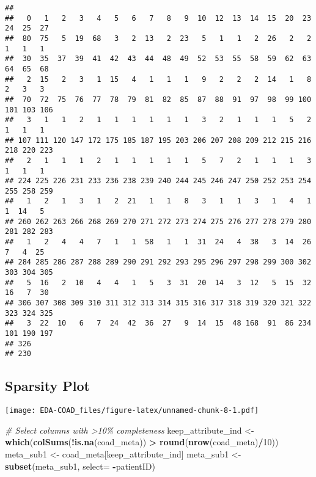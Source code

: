 \documentclass[
]{article}
\newenvironment{Shaded}{\begin{snugshade}}{\end{snugshade}}
\newcommand{\AttributeTok}[1]{\textcolor[rgb]{0.13,0.29,0.53}{#1}}
\newcommand{\CommentTok}[1]{\textcolor[rgb]{0.56,0.35,0.01}{\textit{#1}}}
\newcommand{\DecValTok}[1]{\textcolor[rgb]{0.00,0.00,0.81}{#1}}
\newcommand{\FunctionTok}[1]{\textcolor[rgb]{0.13,0.29,0.53}{\textbf{#1}}}
\newcommand{\NormalTok}[1]{#1}
\newcommand{\OtherTok}[1]{\textcolor[rgb]{0.56,0.35,0.01}{#1}}
\newcommand{\SpecialCharTok}[1]{\textcolor[rgb]{0.81,0.36,0.00}{\textbf{#1}}}
\begin{document}
\begin{verbatim}
## 
##   0   1   2   3   4   5   6   7   8   9  10  12  13  14  15  20  23  24  25  27 
##  80  75   5  19  68   3   2  13   2  23   5   1   1   2  26   2   2   1   1   1 
##  30  35  37  39  41  42  43  44  48  49  52  53  55  58  59  62  63  64  65  68 
##   2  15   2   3   1  15   4   1   1   1   9   2   2   2  14   1   8   2   3   3 
##  70  72  75  76  77  78  79  81  82  85  87  88  91  97  98  99 100 101 103 106 
##   3   1   1   2   1   1   1   1   1   1   3   2   1   1   1   5   2   1   1   1 
## 107 111 120 147 172 175 185 187 195 203 206 207 208 209 212 215 216 218 220 223 
##   2   1   1   1   2   1   1   1   1   1   5   7   2   1   1   1   3   1   1   1 
## 224 225 226 231 233 236 238 239 240 244 245 246 247 250 252 253 254 255 258 259 
##   1   2   1   3   1   2  21   1   1   8   3   1   1   3   1   4   1   1  14   5 
## 260 262 263 266 268 269 270 271 272 273 274 275 276 277 278 279 280 281 282 283 
##   1   2   4   4   7   1   1  58   1   1  31  24   4  38   3  14  26   7   4  25 
## 284 285 286 287 288 289 290 291 292 293 295 296 297 298 299 300 302 303 304 305 
##   5  16   2  10   4   4   1   5   3  31  20  14   3  12   5  15  32  16   7  30 
## 306 307 308 309 310 311 312 313 314 315 316 317 318 319 320 321 322 323 324 325 
##   3  22  10   6   7  24  42  36  27   9  14  15  48 168  91  86 234 101 190 197 
## 326 
## 230
\end{verbatim}

\hypertarget{sparsity-plot}{%
\subsection{Sparsity Plot}\label{sparsity-plot}}

\texttt{[image: EDA-COAD\_files/figure-latex/unnamed-chunk-8-1.pdf]}

\begin{Shaded}
\begin{Highlighting}[]
\CommentTok{\# Select columns with \textgreater{}10\% completeness}
\NormalTok{keep\_attribute\_ind }\OtherTok{\textless{}{-}} \FunctionTok{which}\NormalTok{(}\FunctionTok{colSums}\NormalTok{(}\SpecialCharTok{!}\FunctionTok{is.na}\NormalTok{(coad\_meta)) }\SpecialCharTok{\textgreater{}} \FunctionTok{round}\NormalTok{(}\FunctionTok{nrow}\NormalTok{(coad\_meta)}\SpecialCharTok{/}\DecValTok{10}\NormalTok{))}
\NormalTok{meta\_sub1 }\OtherTok{\textless{}{-}}\NormalTok{ coad\_meta[keep\_attribute\_ind]}
\NormalTok{meta\_sub1 }\OtherTok{\textless{}{-}} \FunctionTok{subset}\NormalTok{(meta\_sub1, }\AttributeTok{select=} \SpecialCharTok{{-}}\NormalTok{patientID)}
\end{Highlighting}
\end{Shaded}
\end{document}
